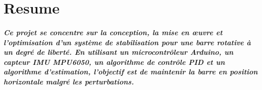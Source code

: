 \thispagestyle{plain} %
\chapter*{Resume} %
\paragraph*{Ce projet se concentre sur la conception, la mise en œuvre et l'optimisation d'un système de stabilisation pour une barre rotative à un degré de liberté. En utilisant un microcontrôleur Arduino, un capteur IMU MPU6050, un algorithme de contrôle PID et un algorithme d'estimation, l'objectif est de maintenir la barre en position horizontale malgré les perturbations.}
\blankpage
